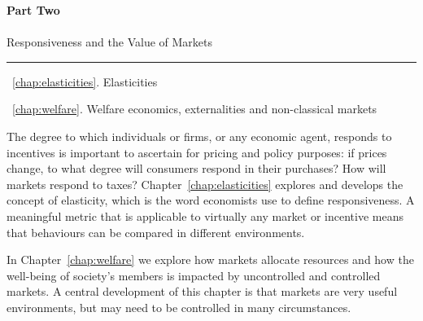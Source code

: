 \cleardoublepage
\thispagestyle{empty}
\vspace{30mm}
{\color{parttextcolour}\fontsize{1.25cm}{3em}\selectfont\textbf{Part Two}} \\ \\
{\color{parttextcolour}\huge Responsiveness and the Value of Markets}

\vspace{10mm}
{\color{partlinecolour}\rule{25em}{2pt}}
\vspace{10mm}

{\large\color{parttextcolour}
~\ref{chap:elasticities}. Elasticities

~\ref{chap:welfare}. Welfare economics, externalities and non-classical markets}

\vspace{10mm}

{\normalfont The degree to which individuals or firms, or any economic agent, responds to incentives is important to ascertain for pricing and policy purposes: if prices change, to what degree will consumers respond in their purchases? How will markets respond to taxes? Chapter~\ref{chap:elasticities} explores and develops the concept of elasticity, which is the word economists use to define responsiveness. A meaningful metric that is applicable to virtually any market or incentive means that behaviours can be compared in different environments. 

In Chapter~\ref{chap:welfare} we explore how markets allocate resources and how the well-being of society's members is impacted by uncontrolled and controlled markets. A central development of this chapter is that markets are very useful environments, but may need to be controlled in many circumstances.}

